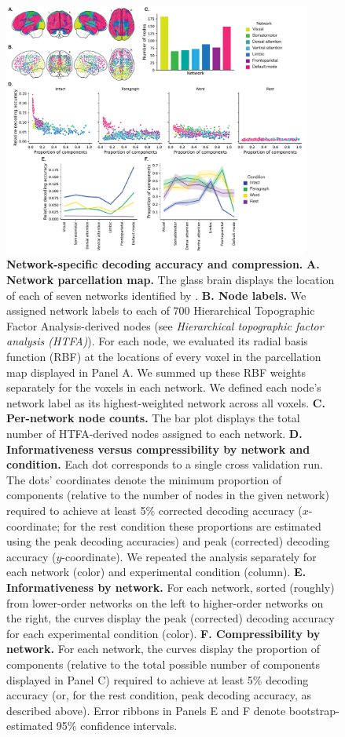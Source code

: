 \documentclass[english, 11pt]{article}
\providecommand{\DIFaddend}{} %
\DeclareRobustCommand{\DIFaddend}{\DIFOaddend \let\includegraphics\DIFOincludegraphics} %
\begin{document}
\DIFaddend \begin{figure}[tp]
  \centering
  \includegraphics[width=0.9\textwidth]{figs/network_results}

  \caption{\textbf{Network-specific decoding accuracy and compression.}
  \textbf{A. Network parcellation map.} The glass brain displays the location
  of each of seven networks identified by \cite{YeoEtal11}. \textbf{B. Node
  labels.} We assigned network labels to each of 700 Hierarchical Topographic
  Factor Analysis-derived nodes (see \textit{Hierarchical topographic factor
  analysis (HTFA)}). For each node, we evaluated its radial basis function
  (RBF) at the locations of every voxel in the parcellation map displayed in
  Panel A. We summed up these RBF weights separately for the voxels in each
  network. We defined each node's network label as its highest-weighted network
  across all voxels. \textbf{C. Per-network node counts.} The bar plot displays
  the total number of HTFA-derived nodes assigned to each network. \textbf{D.
  Informativeness versus compressibility by network and condition.} Each dot
  corresponds to a single cross validation run. The dots' coordinates denote
  the minimum proportion of components (relative to the number of nodes in the
  given network) required to achieve at least 5\% corrected decoding accuracy
  ($x$-coordinate; for the rest condition these proportions are estimated using
  the peak decoding accuracies) and peak (corrected) decoding accuracy
  ($y$-coordinate). We repeated the analysis separately for each network
  (color) and experimental condition (column). \textbf{E. Informativeness by
  network.} For each network, sorted (roughly) from lower-order networks on the
  left to higher-order networks on the right, the curves display the peak
  (corrected) decoding accuracy for each experimental condition (color).
  \textbf{F. Compressibility by network.} For each network, the curves display
  the proportion of components (relative to the total possible number of
  components displayed in Panel C) required to achieve at least 5\% decoding
  accuracy (or, for the rest condition, peak decoding accuracy, as described
  above). Error ribbons in Panels E and F denote bootstrap-estimated
  95\% confidence intervals.}

  \label{fig:networks}
\end{figure}
\end{document}
